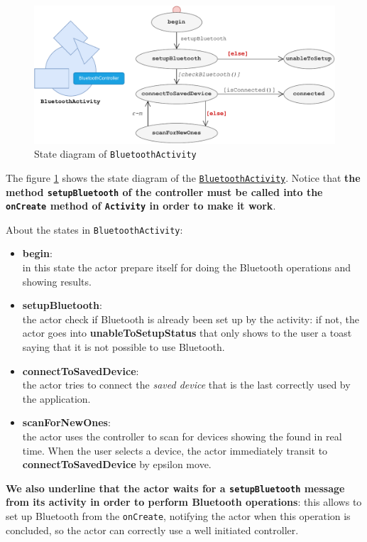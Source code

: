 \begin{figure}[h!]
	\centering
	\includegraphics[width=\textwidth]{img/bluetoothactivity.pdf}
	\caption{State diagram of \texttt{BluetoothActivity}}
	\label{fig:bluetoothactivity}
\end{figure}

The figure \ref{fig:bluetoothactivity} shows the state diagram of the \href{https://github.com/LucaLand/MobileSystemsProject-LL/blob/0.9.1/app/src/main/java/it/unibo/mobilesystems/BluetoothConnectionActivity.kt}{\texttt{BluetoothActivity}}. Notice that \textbf{the method \texttt{setupBluetooth} of the controller must be called into the \texttt{onCreate} method of \texttt{Activity} in order to make it work}.

About the states in \texttt{BluetoothActivity}:
\begin{itemize}
	\item \textbf{begin}:\\
	in this state the actor prepare itself for doing the Bluetooth operations and showing results.
	
	\item \textbf{setupBluetooth}:\\
	the actor check if Bluetooth is already been set up by the activity: if not, the actor goes into \textbf{unableToSetupStatus} that only shows to the user a toast saying that it is not possible to use Bluetooth.
	
	\item \textbf{connectToSavedDevice}:\\
	the actor tries to connect the \textit{saved device} that is the last correctly used by the application.
	
	\item \textbf{scanForNewOnes}:\\
	the actor uses the controller to scan for devices showing the found in real time. When the user selects a device, the actor immediately transit to \textbf{connectToSavedDevice} by epsilon move.
	
\end{itemize}
\textbf{We also underline that the actor waits for a \texttt{setupBluetooth} message from its activity in order to perform Bluetooth operations}: this allows to set up Bluetooth from the \texttt{onCreate}, notifying the actor when this operation is concluded, so the actor can correctly use a well initiated controller. 